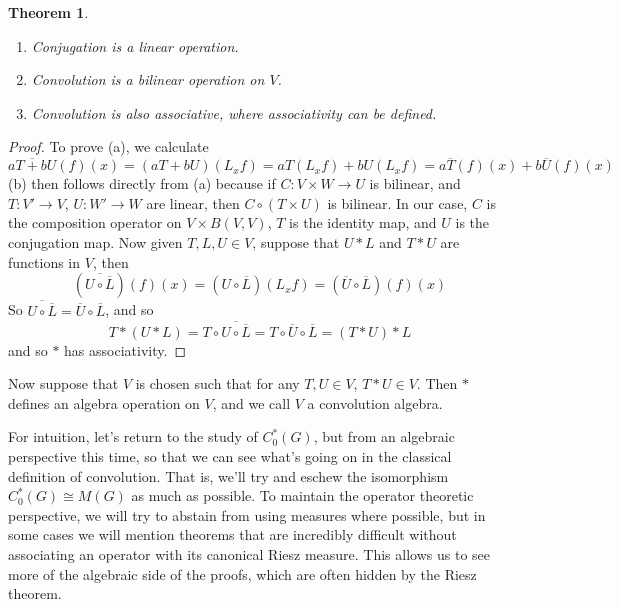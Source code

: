\documentclass{article}
\theoremstyle{plain}
\newtheorem{theorem}{Theorem}
\theoremstyle{definition}
\begin{document}
\begin{theorem}\ 
    \begin{enumerate}
        \item[(a)] Conjugation is a linear operation.
        \item[(b)] Convolution is a bilinear operation on $V$.
        \item[(c)] Convolution is also associative, where associativity can be defined.
    \end{enumerate}
\end{theorem}
\begin{proof}
    To prove (a), we calculate
    \[ \overline{aT + bU}(f)(x) = (aT + bU)(L_x f) = a T(L_x f) + bU(L_x f) = a \overline{T}(f)(x) + b \overline{U}(f)(x) \]
    (b) then follows directly from (a) because if $C: V \times W \to U$ is bilinear, and $T: V' \to V$, $U: W' \to W$ are linear, then $C \circ (T \times U)$ is bilinear. In our case, $C$ is the composition operator on $V \times B(V,V)$, $T$ is the identity map, and $U$ is the conjugation map. Now given $T, L, U \in V$, suppose that $U * L$ and $T * U$ are functions in $V$, then
    \[ (\overline{U \circ \overline{L}})(f)(x) = (U \circ \overline{L})(L_x f) = (\overline{U} \circ \overline{L})(f)(x) \]
    So $\overline{U \circ \overline{L}} = \overline{U} \circ \overline{L}$, and so
    \[ T * (U * L) = T \circ \overline{U \circ \overline{L}} = T \circ \overline{U} \circ \overline{L} = (T * U) * L  \]
    and so $*$ has associativity.
\end{proof}
%
Now suppose that $V$ is chosen such that for any $T,U \in V$, $T * U \in V$. Then $*$ defines an algebra operation on $V$, and we call $V$ a convolution algebra.

For intuition, let's return to the study of $C_0^*(G)$, but from an algebraic perspective this time, so that we can see what's going on in the classical definition of convolution. That is, we'll try and eschew the isomorphism $C_0^*(G) \cong M(G)$ as much as possible. To maintain the operator theoretic perspective, we will try to abstain from using measures where possible, but in some cases we will mention theorems that are incredibly difficult without associating an operator with its canonical Riesz measure. This allows us to see more of the algebraic side of the proofs, which are often hidden by the Riesz theorem.
\end{document}
